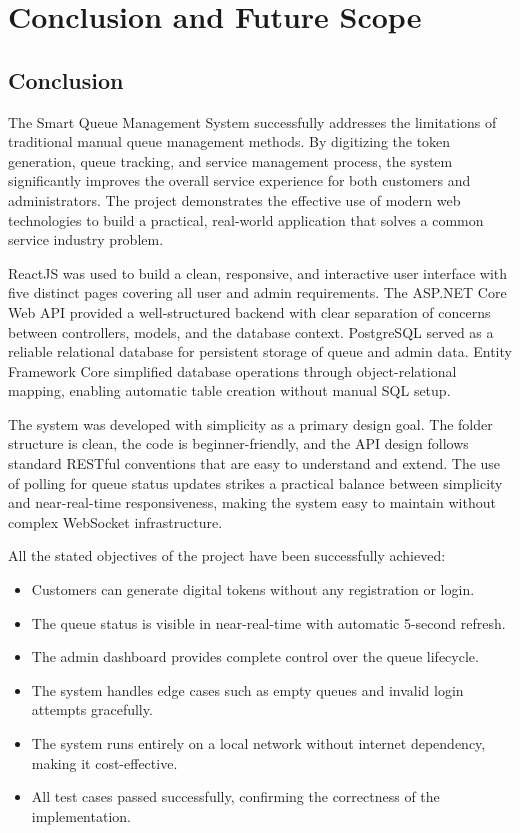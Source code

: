 
\chapter{Conclusion and Future Scope}

\section{Conclusion}

The Smart Queue Management System successfully addresses the limitations of traditional manual queue management methods. By digitizing the token generation, queue tracking, and service management process, the system significantly improves the overall service experience for both customers and administrators. The project demonstrates the effective use of modern web technologies to build a practical, real-world application that solves a common service industry problem.

ReactJS was used to build a clean, responsive, and interactive user interface with five distinct pages covering all user and admin requirements. The ASP.NET Core Web API provided a well-structured backend with clear separation of concerns between controllers, models, and the database context. PostgreSQL served as a reliable relational database for persistent storage of queue and admin data. Entity Framework Core simplified database operations through object-relational mapping, enabling automatic table creation without manual SQL setup.

The system was developed with simplicity as a primary design goal. The folder structure is clean, the code is beginner-friendly, and the API design follows standard RESTful conventions that are easy to understand and extend. The use of polling for queue status updates strikes a practical balance between simplicity and near-real-time responsiveness, making the system easy to maintain without complex WebSocket infrastructure.

All the stated objectives of the project have been successfully achieved:
\begin{itemize}
    \item Customers can generate digital tokens without any registration or login.
    \item The queue status is visible in near-real-time with automatic 5-second refresh.
    \item The admin dashboard provides complete control over the queue lifecycle.
    \item The system handles edge cases such as empty queues and invalid login attempts gracefully.
    \item The system runs entirely on a local network without internet dependency, making it cost-effective.
    \item All test cases passed successfully, confirming the correctness of the implementation.
\end{itemize}

